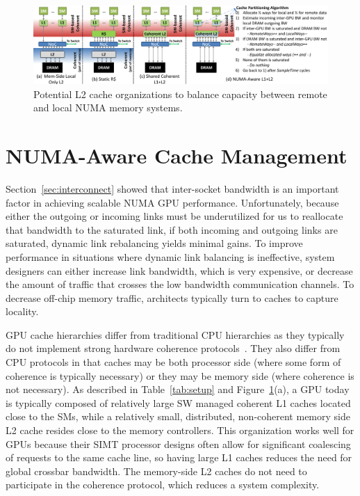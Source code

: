 \begin{figure}[t]
	\centering
	\includegraphics[width=1.0\textwidth]{figures/cache_configurations_static_dynamic.pdf}
	\caption{Potential L2 cache organizations to balance capacity between remote and local NUMA memory systems.}
	\label{fig:cacheorg}
\end{figure}

\section{NUMA-Aware Cache Management}
\label{sec:caches}
Section~\ref{sec:interconnect} showed that inter-socket bandwidth is an
important factor in achieving scalable NUMA GPU performance.
Unfortunately, because either the outgoing or incoming links must be underutilized
for us to reallocate that bandwidth to the saturated link, if both incoming and
outgoing links are saturated, dynamic link rebalancing yields minimal gains.
To improve performance in situations where dynamic link balancing is ineffective,
system designers can either increase link bandwidth, which is very expensive,
or decrease the amount of traffic that crosses the low bandwidth
communication channels. To decrease off-chip memory traffic, architects typically
turn to caches to capture locality.

GPU cache hierarchies differ from traditional CPU hierarchies as they typically do not implement strong hardware coherence protocols~\cite{singh2013cache}. 
They also differ from CPU protocols in that caches may be both processor side 
(where some form of 
coherence is typically necessary) or they may be memory side (where coherence 
is not necessary).  As described in Table~\ref{tab:setup} and
Figure~\ref{fig:cacheorg}(a), a GPU today is typically composed of relatively 
large SW managed coherent L1 caches located close to the SMs, while a relatively small, 
distributed, 
non-coherent memory side L2 cache resides close to the memory controllers.  
This organization works well for GPUs 
because their SIMT processor designs often allow for significant coalescing 
of requests to the same cache line, so having large L1 caches reduces the 
need for global crossbar bandwidth.  The memory-side L2 caches do not need to participate in the coherence protocol, which reduces a system complexity.


